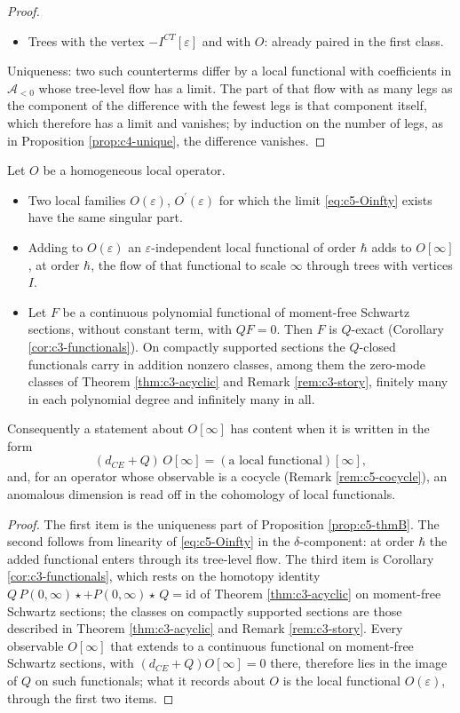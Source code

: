\begin{proof}
\begin{itemize}
\item Trees with the vertex $-I^{CT}[\varepsilon]$ and with $O$: already paired in the first class.
\end{itemize}
Uniqueness: two such counterterms differ by a local functional with coefficients in $\mathscr A_{<0}$ whose tree-level flow has a limit. The part of that flow with as many legs as the component of the difference with the fewest legs is that component itself, which therefore has a limit and vanishes; by induction on the number of legs, as in Proposition \ref{prop:c4-unique}, the difference vanishes.
\end{proof}

\begin{proposition}
\label{prop:c5-local}
Let $O$ be a homogeneous local operator.
\begin{itemize}
\item Two local families $O(\varepsilon)$, $O^{\prime}(\varepsilon)$ for which the limit \eqref{eq:c5-Oinfty} exists have the same singular part.
\item Adding to $O(\varepsilon)$ an $\varepsilon$-independent local functional of order $\hbar$ adds to $O[\infty]$, at order $\hbar$, the flow of that functional to scale $\infty$ through trees with vertices $I$.
\item Let $F$ be a continuous polynomial functional of moment-free Schwartz sections, without constant term, with $QF=0$. Then $F$ is $Q$-exact (Corollary \ref{cor:c3-functionals}). On compactly supported sections the $Q$-closed functionals carry in addition nonzero classes, among them the zero-mode classes of Theorem \ref{thm:c3-acyclic} and Remark \ref{rem:c3-story}, finitely many in each polynomial degree and infinitely many in all.
\end{itemize}
Consequently a statement about $O[\infty]$ has content when it is written in the form
\[
(d_{CE}+Q)\,O[\infty]=(\text{a local functional})[\infty],
\]
and, for an operator whose observable is a cocycle (Remark \ref{rem:c5-cocycle}), an anomalous dimension is read off in the cohomology of local functionals.
\end{proposition}

\begin{proof}
The first item is the uniqueness part of Proposition \ref{prop:c5-thmB}. The second follows from linearity of \eqref{eq:c5-Oinfty} in the $\delta$-component: at order $\hbar$ the added functional enters through its tree-level flow. The third item is Corollary \ref{cor:c3-functionals}, which rests on the homotopy identity $Q\,P(0,\infty)\star+P(0,\infty)\star\,Q=\mathrm{id}$ of Theorem \ref{thm:c3-acyclic} on moment-free Schwartz sections; the classes on compactly supported sections are those described in Theorem \ref{thm:c3-acyclic} and Remark \ref{rem:c3-story}. Every observable $O[\infty]$ that extends to a continuous functional on moment-free Schwartz sections, with $(d_{CE}+Q)O[\infty]=0$ there, therefore lies in the image of $Q$ on such functionals; what it records about $O$ is the local functional $O(\varepsilon)$, through the first two items.
\end{proof}

